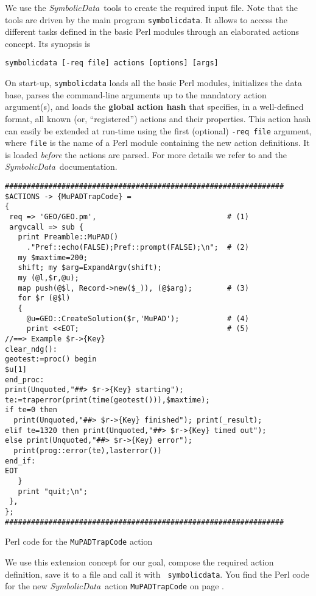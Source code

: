\documentclass[11pt]{article}
\newcommand{\SD}{{\it Symbo\-lic\-Data}}
\begin{document}
We use the \SD\ tools to create the required input file. Note
that the tools are driven by the main program {\tt symbolicdata}.
It allows to access the different tasks defined in the basic Perl
modules through an elaborated actions concept. Its synopsis is
\begin{center}
\mbox{\tt symbolicdata [-req file] actions [options] [args]}
\end{center}
On start-up, {\tt symbolicdata} loads all the basic Perl modules,
initializes the data base, parses the command-line arguments up
to the mandatory action argument(s), and loads the {\bf global
action hash} that specifies, in a well-defined format, all known
(or, ``registered'') actions and their properties. This action
hash can easily be extended at run-time using the first
(optional) {\tt -req file} argument, where {\tt file} is the name
of a Perl module containing the new action definitions. It is
loaded {\em before} the actions are parsed. For more details we
refer to \cite{Bachmann_00a, karlsruhe-02} and the \SD\
documentation.
\medskip

\begin{table}[ht]\label{table:4}{\small
\begin{verbatim}
################################################################
$ACTIONS -> {MuPADTrapCode} =
{
 req => 'GEO/GEO.pm',                              # (1)
 argvcall => sub {
   print Preamble::MuPAD()
     ."Pref::echo(FALSE);Pref::prompt(FALSE);\n";  # (2)
   my $maxtime=200;
   shift; my $arg=ExpandArgv(shift);
   my (@l,$r,@u);
   map push(@$l, Record->new($_)), (@$arg);        # (3)
   for $r (@$l)
   {
     @u=GEO::CreateSolution($r,'MuPAD');           # (4)
     print <<EOT;                                  # (5)
//==> Example $r->{Key}
clear_ndg():
geotest:=proc() begin
$u[1]
end_proc:
print(Unquoted,"##> $r->{Key} starting");
te:=traperror(print(time(geotest())),$maxtime);
if te=0 then 
  print(Unquoted,"##> $r->{Key} finished"); print(_result);
elif te=1320 then print(Unquoted,"##> $r->{Key} timed out");
else print(Unquoted,"##> $r->{Key} error");
  print(prog::error(te),lasterror()) 
end_if:
EOT
   }
   print "quit;\n";
 },
};
################################################################
\end{verbatim}}
\centerline{Perl code for the {\tt MuPADTrapCode} action}
\end{table}

We use this extension concept for our goal, compose the required
action definition, save it to a file and call it with {\tt
symbolicdata}.  You find the Perl code for the new \SD\ action
{\tt MuPADTrapCode} on page \pageref{table:4}.
\end{document}
